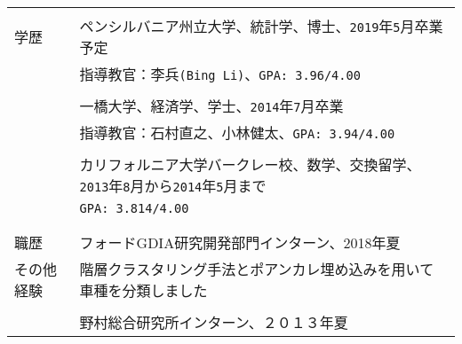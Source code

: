 \documentclass[utf8,letterpaper,oneside]{article}
\begin{document}
\begin{center}
 \begin{tabular}{l l}
  \hline
             &                                                                                                                \\
  学歴       & ペンシルバニア州立大学、統計学、博士、\texttt{2019}年\texttt{5}月卒業予定                                      \\
             & 指導教官：李兵\texttt{(Bing Li)}、\texttt{GPA: 3.96/4.00}                                                      \\
             &                                                                                                                \\
             & 一橋大学、経済学、学士、\texttt{2014}年\texttt{7}月卒業                                                        \\
             & 指導教官：石村直之、小林健太、\texttt{GPA: 3.94/4.00}                                                          \\
             &                                                                                                                \\
             & カリフォルニア大学バークレー校、数学、交換留学、\texttt{2013}年\texttt{8}月から\texttt{2014}年\texttt{5}月まで \\
             & \texttt{GPA: 3.814/4.00}                                                                                       \\
             &                                                                                                                \\ \hline
             &                                                                                                                \\
  職歴       & フォードGDIA研究開発部門インターン、2018年夏                                                                   \\
  その他経験 & 階層クラスタリング手法とポアンカレ埋め込みを用いて車種を分類しました                                           \\
             &                                                                                                                \\
             & 野村総合研究所インターン、２０１３年夏                                                                         \\

\end{tabular}
\end{center}
\end{document}
